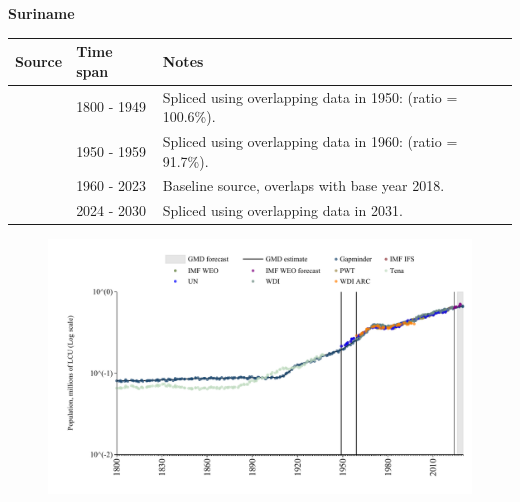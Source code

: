 \documentclass[12pt,a4paper,landscape]{article}
\begin{document}
\begin{adjustbox}{max totalsize={\paperwidth}{\paperheight},center}
\begin{minipage}[t][\textheight][t]{\textwidth}
\vspace*{0.5cm}
{}
\begin{center}
{\Large\bfseries Suriname}
\end{center}
\vspace{0.5cm}
\begin{table}[H]
\centering
\small
\begin{tabular}{|l|l|l|}
\hline
\textbf{Source} & \textbf{Time span} & \textbf{Notes} \\
\hline
\rowcolor{white}\cite{Gapminder}& 1800 - 1949 &Spliced using overlapping data in 1950: (ratio = 100.6\%).\\
\rowcolor{lightgray}\cite{IMF_IFS}& 1950 - 1959 &Spliced using overlapping data in 1960: (ratio = 91.7\%).\\
\rowcolor{white}\cite{WDI}& 1960 - 2023 &Baseline source, overlaps with base year 2018.\\
\rowcolor{lightgray}\cite{Gapminder}& 2024 - 2030 &Spliced using overlapping data in 2031.\\
\hline
\end{tabular}
\end{table}
\begin{figure}[H]
\centering
\includegraphics[width=\textwidth,height=0.6\textheight,keepaspectratio]{graphs/SUR_pop.pdf}
\end{figure}
\end{minipage}
\end{adjustbox}
\end{document}
